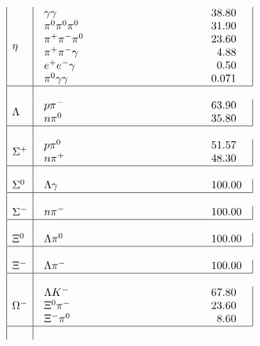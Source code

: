 \[\begin{array}{|l|l|}
\eta           &
\begin{array}{lr}
\makebox[5cm][l]{$\gamma\gamma$}         &  38.80    \\
\pi^0\pi^0\pi^0        &  31.90    \\
\pi^+\pi^-\pi^0        &  23.60    \\
\pi^+\pi^-\gamma       &  4.88     \\
e^+e^-\gamma           &  0.50     \\
\pi^0\gamma\gamma      &  0.071
\end{array} \\ \hline

\Lambda        &
\begin{array}{lr}
\makebox[5cm][l]{$p\pi^-$}               &  63.90    \\
n\pi^0                 &  35.80
\end{array} \\ \hline

\Sigma^{+}     &
\begin{array}{lr}
\makebox[5cm][l]{$p\pi^0$}               &  51.57    \\
n\pi^+                 &  48.30
\end{array} \\ \hline

\Sigma^{0}     &
\begin{array}{lr}
\makebox[5cm][l]{$\Lambda\gamma$}        &  100.00
\end{array} \\ \hline

\Sigma^{-}     &
\begin{array}{lr}
\makebox[5cm][l]{$n\pi^-$}               & 100.00
\end{array} \\ \hline

\Xi^0          &
\begin{array}{lr}
\makebox[5cm][l]{$\Lambda\pi^0$}         & 100.00
\end{array} \\ \hline

\Xi^-          &
\begin{array}{lr}
\makebox[5cm][l]{$\Lambda\pi^-$}         & 100.00
\end{array} \\ \hline

\Omega^-       &
\begin{array}{lr}
\makebox[5cm][l]{$\Lambda K^-$}          &  67.80    \\
\Xi^0\pi^-             &  23.60    \\
\Xi^-\pi^0             &  8.60
\end{array} \\ \hline


\end{array}\]
